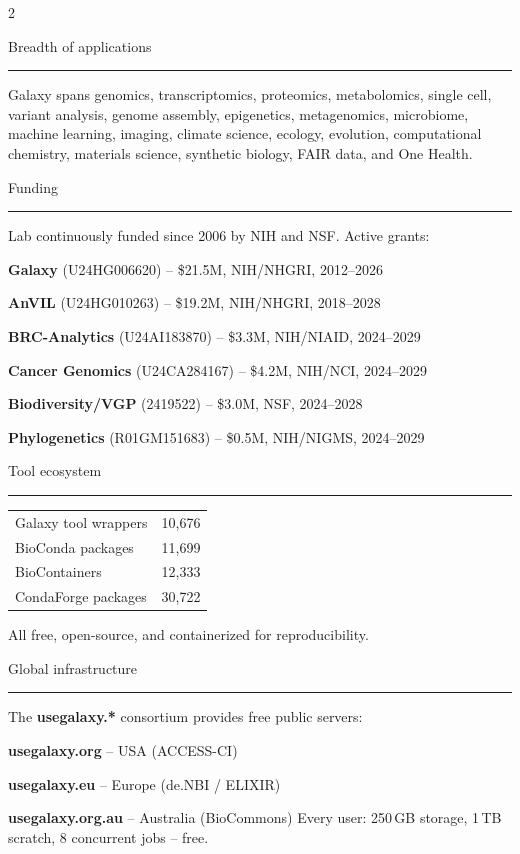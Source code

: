 \documentclass[11pt]{article}
\DeclareRobustCommand{\sbseries}{\fontseries{sb}\selectfont}
\let\olditemize\itemize
\let\oldenditemize\enditemize
\renewenvironment{itemize}{%
  \olditemize
  \setlength{\itemsep}{1pt}%
  \setlength{\parskip}{0pt}%
  \setlength{\parsep}{0pt}%
  \setlength{\topsep}{2pt}%
  \setlength{\leftmargin}{6pt}%
  \renewcommand{\labelitemi}{--}%
}{%
  \oldenditemize
}
\newcommand{\sect}[1]{%
  \vspace{8pt}%
  {\color{galaxydark}\large\sbseries #1}\\[-2pt]%
  {\color{galaxyorange}\rule{\linewidth}{1.5pt}}%
  \vspace{4pt}%
}
\begin{document}
\begin{multicols}{2}

\sect{Breadth of applications}
Galaxy spans genomics, transcriptomics, proteomics, metabolomics, single cell, variant analysis, genome assembly, epigenetics, metagenomics, microbiome, machine learning, imaging, climate science, ecology, evolution, computational chemistry, materials science, synthetic biology, FAIR data, and One Health.

\sect{Funding}
Lab continuously funded since 2006 by NIH and NSF. Active grants:
\begin{itemize}
  \item \textbf{Galaxy} (U24HG006620) -- \$21.5M, NIH/NHGRI, 2012--2026
  \item \textbf{AnVIL} (U24HG010263) -- \$19.2M, NIH/NHGRI, 2018--2028
  \item \textbf{BRC-Analytics} (U24AI183870) -- \$3.3M, NIH/NIAID, 2024--2029
  \item \textbf{Cancer Genomics} (U24CA284167) -- \$4.2M, NIH/NCI, 2024--2029
  \item \textbf{Biodiversity/VGP} (2419522) -- \$3.0M, NSF, 2024--2028
  \item \textbf{Phylogenetics} (R01GM151683) -- \$0.5M, NIH/NIGMS, 2024--2029
\end{itemize}

\sect{Tool ecosystem}
\begin{tabularx}{\linewidth}{Xr}
Galaxy tool wrappers & 10,676 \\
BioConda packages & 11,699 \\
BioContainers & 12,333 \\
CondaForge packages & 30,722 \\
\end{tabularx}

\vspace{2pt}
{\small\color{textgray} All free, open-source, and containerized for reproducibility.}

\sect{Global infrastructure}
The \textbf{usegalaxy.*} consortium provides free public servers:
\begin{itemize}
  \item \textbf{usegalaxy.org} -- USA (ACCESS-CI)
  \item \textbf{usegalaxy.eu} -- Europe (de.NBI / ELIXIR)
  \item \textbf{usegalaxy.org.au} -- Australia (BioCommons)
\end{itemize}
{\small\color{textgray} Every user: 250\,GB storage, 1\,TB scratch, 8 concurrent jobs -- free.}


\end{multicols}
\end{document}
